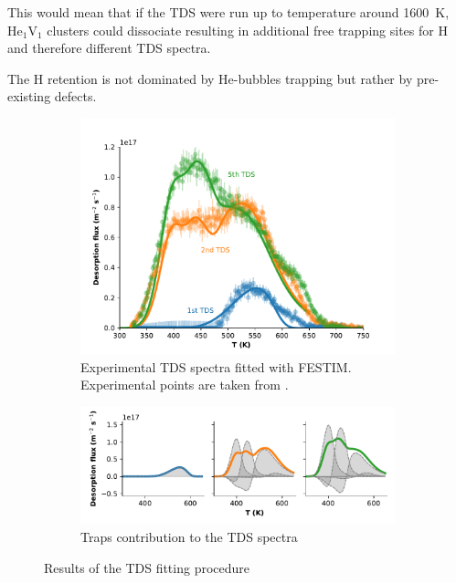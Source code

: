 This would mean that if the TDS were run up to temperature around \SI{1600}{K}, $\mathrm{He}_1\mathrm{V}_1$ clusters could dissociate resulting in additional free trapping sites for H and therefore different TDS spectra.

The H retention is not dominated by He-bubbles trapping but rather by pre-existing defects.

\begin{figure}[h!]
    \centering
    \begin{subfigure}{\linewidth}
        \includegraphics[width=\linewidth]{Figures/Chapter5/ialovega_tds.pdf}
        \caption{Experimental TDS spectra fitted with FESTIM. Experimental points are taken from \cite{ialovega_hydrogen_2020}.}
        \label{fig: 3 TDS}
    \end{subfigure}
    \begin{subfigure}{\linewidth}
        \includegraphics[width=\linewidth]{Figures/Chapter5/tds_trap_distribution.pdf}
        \caption{Traps contribution to the TDS spectra}
        \label{fig: trap contributions}
    \end{subfigure}
    \caption{Results of the TDS fitting procedure}
    \label{fig: fitted TDS}
\end{figure}

